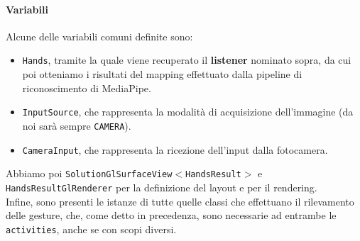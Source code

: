\paragraph{Variabili} Alcune delle variabili comuni definite sono:
\begin{itemize}
    \item \texttt{Hands}, tramite la quale viene recuperato il \textbf{listener} nominato sopra, da cui poi otteniamo i risultati del mapping effettuato dalla pipeline di riconoscimento di MediaPipe.
    \item \texttt{InputSource}, che rappresenta la modalità di acquisizione dell'immagine (da noi sarà sempre \texttt{CAMERA}).
    \item \texttt{CameraInput}, che rappresenta la ricezione dell'input dalla fotocamera.
\end{itemize}
\noindent Abbiamo poi \texttt{SolutionGlSurfaceView$<$HandsResult$>$} e \texttt{HandsResultGlRenderer} per la definizione del layout e per il rendering.\\ 
Infine, sono presenti le istanze di tutte quelle classi che effettuano il rilevamento delle gesture, che, come detto in precedenza, sono necessarie ad entrambe le \texttt{activities}, anche se con scopi diversi.

